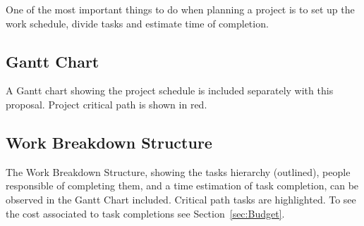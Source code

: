
One of the most important things to do when
planning a project is to set up the work schedule, divide tasks and estimate
time of completion.

\subsection{Gantt Chart}

A Gantt chart showing the project schedule is included
separately with this proposal. Project critical path is shown in red.

\subsection{Work Breakdown Structure}

The Work Breakdown Structure, showing the
tasks hierarchy (outlined), people responsible  of completing them, and a time
estimation of task completion, can be observed in the
Gantt Chart included. Critical path tasks are highlighted. To see the cost 
associated to task completions see Section~\ref{sec:Budget}.
